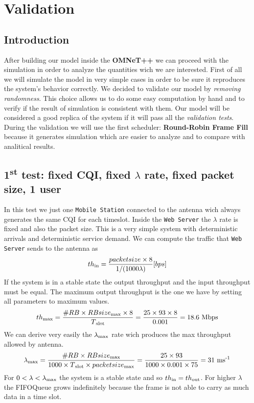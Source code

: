 \chapter{Validation}

\section{Introduction}
After building our model inside the \textbf{OMNeT++} we can proceed with the simulation in order to analyze the quantities wich we are interested. First of all we will simulate the model in very simple cases in order to be sure it reproduces the system's behavior correctly. We decided to validate our model by \textit{removing randomness}. This choice allows us to do some easy computation by hand and to verify if the result of simulation is consistent with them. Our model will be considered a good replica of the system if it will pass all the \textit{validation tests}. During the validation we will use the first scheduler: \textbf{Round-Robin Frame Fill} because it generates simulation which are easier to analyze and to compare with analitical results.

\section{1\textsuperscript{st} test: fixed CQI, fixed \(\lambda\) rate, fixed packet size, 1 user}
In this test we just one \texttt{Mobile Station} connected to the antenna wich always generates the same CQI for each timeslot. Inside the \texttt{Web Server} the \(\lambda\) rate is fixed and also the packet size. This is a very simple system with deterministic arrivals and deterministic service demand. We can compute the traffic that \texttt{Web Server} sends to the antenna as \[ th\textsubscript{in} = \frac{packetsize \times 8}{1/(1000\lambda)} \lbrack bps \rbrack \] 
If the system is in a stable state the output throughput and the input throughput must be equal. The maximum output throughput is the one we have by setting all parameters to maximum values. \[ th\textsubscript{max} = \frac{\#RB \times RBsize\textsubscript{max} \times 8}{T\textsubscript{slot}} = \frac{25 \times 93 \times 8}{0.001} = 18.6 \textnormal{ Mbps} \] We can derive very easily the \(\lambda\textsubscript{max}\) rate wich produces the max throughput allowed by antenna. \[\lambda\textsubscript{max} = \frac{\#RB \times RBsize\textsubscript{max}}{1000 \times T\textsubscript{slot} \times packetsize\textsubscript{max}} = \frac{25 \times 93}{1000 \times 0.001 \times 75} = 31 \textnormal{ ms\textsuperscript{-1}} \] For \( 0<\lambda<\lambda\textsubscript{max} \) the system is a stable state and so \(th\textsubscript{in} = th\textsubscript{out}\). For higher \(\lambda\) the FIFOQueue grows indefinitely because the frame is not able to carry as much data in a time slot.

